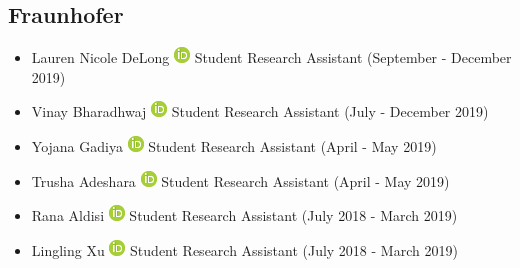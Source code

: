 \documentclass[10pt,a4paper,sans]{moderncv} %
\begin{document}
    \subsection{Fraunhofer}
        \begin{itemize}
        \item     Lauren Nicole DeLong {\scriptsize     \href{https://orcid.org/0000-0001-6618-3370}{\includegraphics[scale=0.5]{img/ORCIDiD_icon16x16}}
}    Student Research Assistant (September - December 2019)

        \item     Vinay Bharadhwaj {\scriptsize     \href{https://orcid.org/0000-0002-9901-9494}{\includegraphics[scale=0.5]{img/ORCIDiD_icon16x16}}
}    Student Research Assistant (July - December 2019)

        \item     Yojana Gadiya {\scriptsize     \href{https://orcid.org/0000-0002-7683-0452}{\includegraphics[scale=0.5]{img/ORCIDiD_icon16x16}}
}    Student Research Assistant (April - May 2019)

        \item     Trusha Adeshara {\scriptsize     \href{https://orcid.org/0000-0002-8929-4724}{\includegraphics[scale=0.5]{img/ORCIDiD_icon16x16}}
}    Student Research Assistant (April - May 2019)

        \item     Rana Aldisi {\scriptsize     \href{https://orcid.org/0000-0002-3034-9970}{\includegraphics[scale=0.5]{img/ORCIDiD_icon16x16}}
}    Student Research Assistant (July 2018 - March 2019)

        \item     Lingling Xu {\scriptsize     \href{https://orcid.org/0000-0002-0303-8616}{\includegraphics[scale=0.5]{img/ORCIDiD_icon16x16}}
}    Student Research Assistant (July 2018 - March 2019)


\end{itemize}
\end{document}
